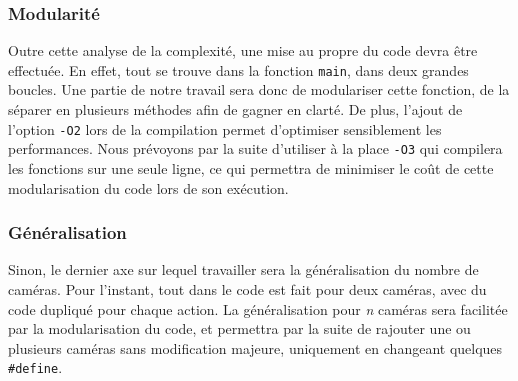 \subsubsection{Modularité}

Outre cette analyse de la complexité, une mise au propre du code devra être effectuée. En effet, tout se trouve dans la fonction \texttt{main}, dans deux grandes boucles. Une partie de notre travail sera donc de modulariser cette fonction, de la séparer en plusieurs méthodes afin de gagner en clarté. De plus, l'ajout de l'option \texttt{-O2} lors de la compilation permet d'optimiser sensiblement les performances. Nous prévoyons par la suite d'utiliser à la place \texttt{-O3} qui compilera les fonctions sur une seule ligne, ce qui permettra de minimiser le coût de cette modularisation du code lors de son exécution.

\subsubsection{Généralisation}

Sinon, le dernier axe sur lequel travailler sera la généralisation du nombre de caméras. Pour l'instant, tout dans le code est fait pour deux caméras, avec du code dupliqué pour chaque action. La généralisation pour \textit{n} caméras sera facilitée par la modularisation du code, et permettra par la suite de rajouter une ou plusieurs caméras sans modification majeure, uniquement en changeant quelques \texttt{\#define}.
